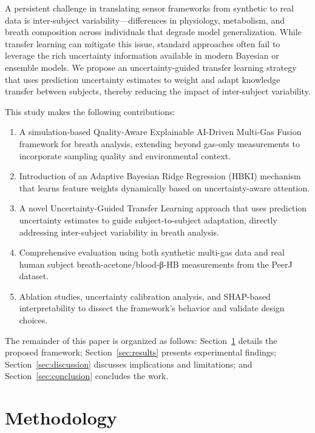 \documentclass{ieeeaccess}
\begin{document}
A persistent challenge in translating sensor frameworks from synthetic to real data is inter-subject variability—differences in physiology, metabolism, and breath composition across individuals that degrade model generalization. While transfer learning can mitigate this issue, standard approaches often fail to leverage the rich uncertainty information available in modern Bayesian or ensemble models. We propose an uncertainty-guided transfer learning strategy that uses prediction uncertainty estimates to weight and adapt knowledge transfer between subjects, thereby reducing the impact of inter-subject variability.

This study makes the following contributions:
\begin{enumerate}
\item A simulation-based Quality-Aware Explainable AI-Driven Multi-Gas Fusion framework for breath analysis, extending beyond gas-only measurements to incorporate sampling quality and environmental context.
\item Introduction of an Adaptive Bayesian Ridge Regression (HBKI) mechanism that learns feature weights dynamically based on uncertainty-aware attention.
\item A novel Uncertainty-Guided Transfer Learning approach that uses prediction uncertainty estimates to guide subject-to-subject adaptation, directly addressing inter-subject variability in breath analysis.
\item Comprehensive evaluation using both synthetic multi-gas data and real human subject breath-acetone/blood-β-HB measurements from the PeerJ dataset.
\item Ablation studies, uncertainty calibration analysis, and SHAP-based interpretability to dissect the framework's behavior and validate design choices.
\end{enumerate}

The remainder of this paper is organized as follows: Section~\ref{sec:methodology} details the proposed framework; Section~\ref{sec:results} presents experimental findings; Section~\ref{sec:discussion} discusses implications and limitations; and Section~\ref{sec:conclusion} concludes the work.


\section{Methodology}
\label{sec:methodology}
\end{document}
